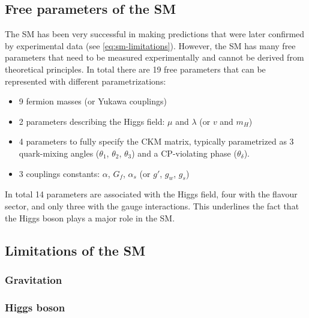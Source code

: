 

\subsection{Free parameters of the SM}
The SM has been very successful in making predictions that were later confirmed by experimental data (see \cref{eq:sm-limitations}). However, the SM has many free parameters that need to be measured experimentally and cannot be derived from theoretical principles.  
In total there are 19 free parameters that can be represented with different parametrizations:
\begin{itemize}
  \item 9 fermion masses (or Yukawa couplings)
  \item 2 parameters describing the Higgs field: $\mu$ and $\lambda$ (or $v$ and $m_H$)
  \item 4 parameters to fully specify the CKM matrix, typically parametrized as 3 quark-mixing angles ($\theta_1$, $\theta_2$, $\theta_3$) and a CP-violating phase ($\theta_\delta$).
  \item 3 couplings constants: $\alpha$, $G_f$, $\alpha_s$ (or $g'$, $g_w$, $g_s$)
\end{itemize}
In total 14 parameters are associated with the Higgs field, four with the flavour sector, and only three with the gauge interactions. This underlines the fact that the Higgs boson plays a major role in the SM.


\subsection{Limitations of the SM}


\subsubsection{Gravitation}

\subsubsection{Higgs boson}

